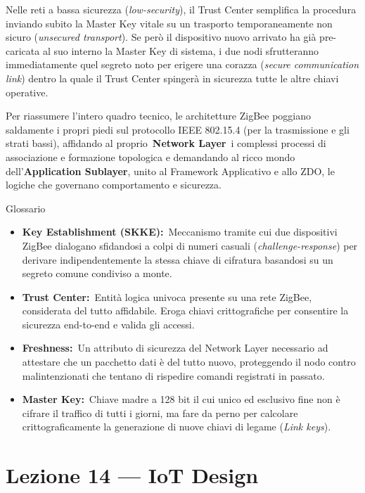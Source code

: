 \documentclass[
  italian,
  openany]{book}
\begin{document}
Nelle reti a bassa sicurezza (\emph{low-security}), il Trust Center
semplifica la procedura inviando subito la Master Key vitale su un
trasporto temporaneamente non sicuro (\emph{unsecured transport}). Se
però il dispositivo nuovo arrivato ha già pre-caricata al suo interno la
Master Key di sistema, i due nodi sfrutteranno immediatamente quel
segreto noto per erigere una corazza (\emph{secure communication link})
dentro la quale il Trust Center spingerà in sicurezza tutte le altre
chiavi operative.

Per riassumere l'intero quadro tecnico, le architetture ZigBee poggiano
saldamente i propri piedi sul protocollo IEEE 802.15.4 (per la
trasmissione e gli strati bassi), affidando al proprio~\textbf{Network
Layer}~i complessi processi di associazione e formazione topologica e
demandando al ricco mondo dell'\textbf{Application Sublayer}, unito al
Framework Applicativo e allo ZDO, le logiche che governano comportamento
e sicurezza.

\begin{calloutnote}{Glossario}

\begin{itemize}
\item
  \textbf{Key Establishment (SKKE):}~Meccanismo tramite cui due
  dispositivi ZigBee dialogano sfidandosi a colpi di numeri casuali
  (\emph{challenge-response}) per derivare indipendentemente la stessa
  chiave di cifratura basandosi su un segreto comune condiviso a monte.
\item
  \textbf{Trust Center:}~Entità logica univoca presente su una rete
  ZigBee, considerata del tutto affidabile. Eroga chiavi crittografiche
  per consentire la sicurezza end-to-end e valida gli accessi.
\item
  \textbf{Freshness:}~Un attributo di sicurezza del Network Layer
  necessario ad attestare che un pacchetto dati è del tutto nuovo,
  proteggendo il nodo contro malintenzionati che tentano di rispedire
  comandi registrati in passato.
\item
  \textbf{Master Key:}~Chiave madre a 128 bit il cui unico ed esclusivo
  fine non è cifrare il traffico di tutti i giorni, ma fare da perno per
  calcolare crittograficamente la generazione di nuove chiavi di legame
  (\emph{Link keys}).
\end{itemize}

\end{calloutnote}

\newpage

\chapter{Lezione 14 --- IoT Design}\label{lezione-14-iot-design}
\end{document}
